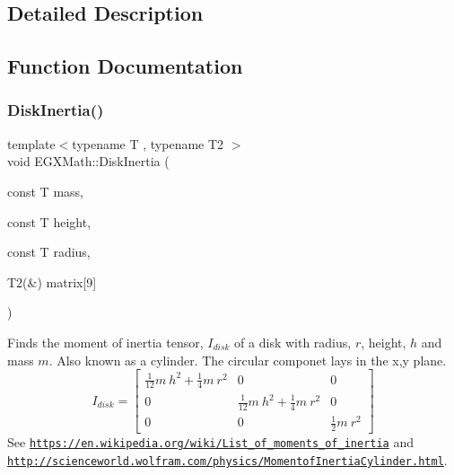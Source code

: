 \subsection{Detailed Description}


\subsection{Function Documentation}
\mbox{\label{group___e_g_x_math-_geometry-3_d-_disk_ga6ed461694b277e36a641a6550bdea68f}} 
\subsubsection{\texorpdfstring{Disk\+Inertia()}{DiskInertia()}\hspace{0.1cm}{\footnotesize\ttfamily [1/3]}}
{\footnotesize\ttfamily template$<$typename T , typename T2 $>$ \\
void E\+G\+X\+Math\+::\+Disk\+Inertia (\begin{DoxyParamCaption}\item[{const T}]{mass,  }\item[{const T}]{height,  }\item[{const T}]{radius,  }\item[{T2(\&)}]{matrix\mbox{[}9\mbox{]} }\end{DoxyParamCaption})}



Finds the moment of inertia tensor, $I_{disk}$ of a disk with radius, $r$, height, $h$ and mass $m$. Also known as a cylinder. The circular componet lays in the x,y plane. \[ I_{disk}=\begin{bmatrix} \frac{1}{12}m\ h^2 + \frac{1}{4}m\ r^2 & 0 & 0\\ 0 & \frac{1}{12}m\ h^2 + \frac{1}{4}m\ r^2 & 0\\ 0 & 0 & \frac{1}{2}m\ r^2 \end{bmatrix} \] See \href{https://en.wikipedia.org/wiki/List_of_moments_of_inertia}{\tt https\+://en.\+wikipedia.\+org/wiki/\+List\+\_\+of\+\_\+moments\+\_\+of\+\_\+inertia} and \href{http://scienceworld.wolfram.com/physics/MomentofInertiaCylinder.html}{\tt http\+://scienceworld.\+wolfram.\+com/physics/\+Momentof\+Inertia\+Cylinder.\+html}. 


